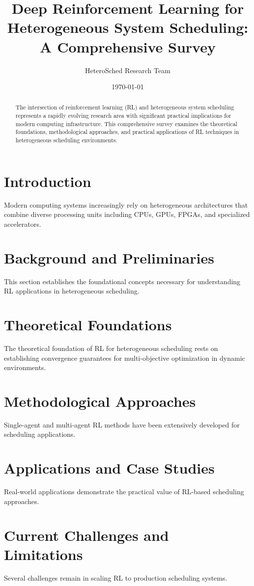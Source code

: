 \documentclass[11pt,twocolumn]{article}
\title{Deep Reinforcement Learning for Heterogeneous System Scheduling: A Comprehensive Survey}
\author{HeteroSched Research Team}
\date{\today}
\begin{document}
\maketitle

\begin{abstract}
The intersection of reinforcement learning (RL) and heterogeneous system scheduling represents a rapidly evolving research area with significant practical implications for modern computing infrastructure. This comprehensive survey examines the theoretical foundations, methodological approaches, and practical applications of RL techniques in heterogeneous scheduling environments.
\end{abstract}

\section{Introduction}
Modern computing systems increasingly rely on heterogeneous architectures that combine diverse processing units including CPUs, GPUs, FPGAs, and specialized accelerators.

\section{Background and Preliminaries}
This section establishes the foundational concepts necessary for understanding RL applications in heterogeneous scheduling.

\section{Theoretical Foundations}
The theoretical foundation of RL for heterogeneous scheduling rests on establishing convergence guarantees for multi-objective optimization in dynamic environments.

\section{Methodological Approaches}
Single-agent and multi-agent RL methods have been extensively developed for scheduling applications.

\section{Applications and Case Studies}
Real-world applications demonstrate the practical value of RL-based scheduling approaches.

\section{Current Challenges and Limitations}
Several challenges remain in scaling RL to production scheduling systems.
\end{document}
